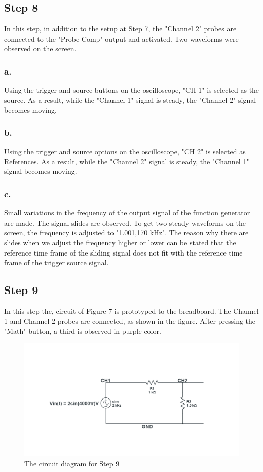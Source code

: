 \documentclass[letterpaper,12pt]{article}
\begin{document}
\subsection{Step 8}
In this step, in addition to the setup at Step 7, the "Channel 2" probes are connected to the "Probe Comp" output and activated. Two waveforms were observed on the screen.
\subsubsection{a.}
Using the trigger and source buttons on the oscilloscope, "CH 1" is selected as the source. As a result, while the "Channel 1" signal is steady, the "Channel 2" signal becomes moving. 
\subsubsection{b.}
Using the trigger and source options on the oscilloscope, "CH 2" is selected as References. As a result, while the "Channel 2" signal is steady, the "Channel 1" signal becomes moving. 
\subsubsection{c.}
Small variations in the frequency of the output signal of the function generator are made. The signal slides are observed. To get two steady waveforms on the screen, the frequency is adjusted to "1.001,170 kHz". The reason why there are slides when we adjust the frequency higher or lower can be stated that the reference time frame of the sliding signal does not fit with the reference time frame of the trigger source signal.

\subsection{Step 9}
In this step the, circuit of Figure  7 is prototyped to the breadboard. The Channel 1 and Channel 2 probes are connected, as shown in the figure. After pressing the "Math" button, a third is observed in purple color. 
\begin{figure}[H]
	\caption{ The circuit diagram for Step 9  }
	\centering
	\includegraphics[width=1\textwidth]{9circuit.png}
\end{figure}
\end{document}

